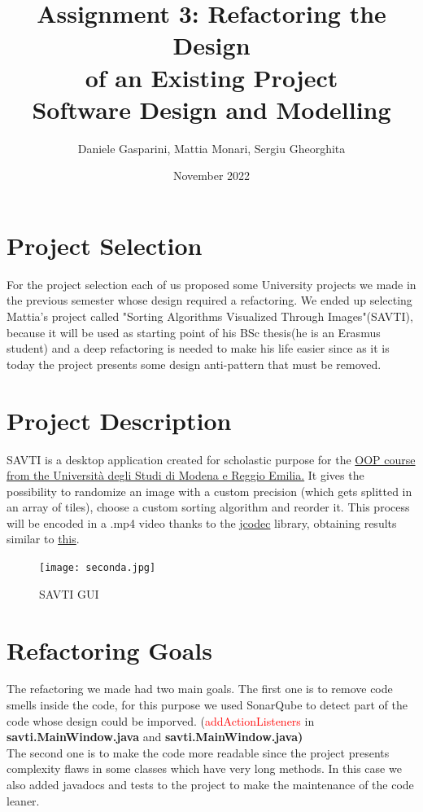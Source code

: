 \documentclass{article}
\title{Assignment 3: Refactoring the Design\\
of an Existing Project\\
\large Software Design and Modelling}
\author{Daniele Gasparini, Mattia Monari, Sergiu Gheorghita}
\date{\nth{28} November 2022}
\begin{document}
\maketitle

\section{Project Selection}
For the project selection each of us proposed some University projects we made in the previous semester whose design required a refactoring. We ended up selecting Mattia's project called "Sorting Algorithms Visualized Through Images"(SAVTI), because it will be used as starting point of his BSc thesis(he is an Erasmus student) and a deep refactoring is needed to make his life easier since as it is today the project presents some design anti-pattern that must be removed.

\section{Project Description}
SAVTI is a desktop application created for scholastic purpose for the \href{https://github.com/nbicocchi/ooprogramming}{OOP course from the Università degli Studi di Modena e Reggio Emilia.} It gives the possibility to randomize an image with a custom precision (which gets splitted in an array of tiles), choose a custom sorting algorithm and reorder it. This process will be encoded in a .mp4 video thanks to the \href{https://github.com/jcodec/jcodec}{jcodec} library, obtaining results similar to \href{https://youtu.be/4lyLJmZbQSA}{this}.
\newline 
\begin{figure} [h!]
    \centering
    \texttt{[image: seconda.jpg]} 
    \caption{SAVTI GUI} 
    \label{GUI}
\end{figure}


\section{Refactoring Goals}
The refactoring we made had two main goals. The first one is to remove code smells inside the code, for this purpose we used SonarQube to detect part of the code whose design could be imporved. 
(\textcolor{red}{addActionListeners} in \textbf{savti.MainWindow.java} and \textbf{savti.MainWindow.java)}\\
The second one is to make the code more readable since the project presents complexity flaws in some classes which have very long methods. In this case we also added javadocs and tests to the project to make the maintenance of the code leaner.
\end{document}
